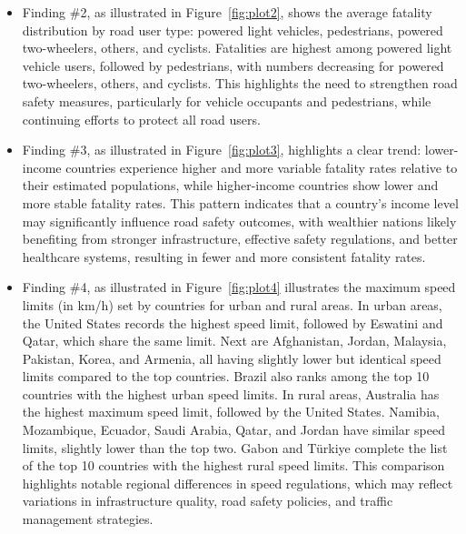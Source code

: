 \documentclass[a4paper,10pt]{article}\setlength{\textheight}{10in}\setlength{\textwidth}{6.5in}\setlength{\topmargin}{-0.125in}\setlength{\oddsidemargin}{-.2in}\setlength{\evensidemargin}{-.2in}\setlength{\headsep}{0.2in}\setlength{\footskip}{0pt}\usepackage{amsmath}\usepackage{fancyhdr}\usepackage{enumitem}\usepackage{hyperref}\usepackage{xcolor}\usepackage{graphicx}\usepackage[export]{adjustbox}\usepackage{caption}\usepackage{float}\usepackage{booktabs}\usepackage{makecell}\pagestyle{fancy}
\begin{document}
\begin{enumerate}[topsep=0mm, partopsep=0mm, leftmargin=*]
\begin{itemize}
        \item Finding \#2, as illustrated in Figure~\ref{fig:plot2}, shows the average fatality distribution by road user type: powered light vehicles, pedestrians, powered two-wheelers, others, and cyclists. Fatalities are highest among powered light vehicle users, followed by pedestrians, with numbers decreasing for powered two-wheelers, others, and cyclists. This highlights the need to strengthen road safety measures, particularly for vehicle occupants and pedestrians, while continuing efforts to protect all road users.

        \item Finding \#3, as illustrated in Figure~\ref{fig:plot3}, highlights a clear trend: lower-income countries experience higher and more variable fatality rates relative to their estimated populations, while higher-income countries show lower and more stable fatality rates. This pattern indicates that a country’s income level may significantly influence road safety outcomes, with wealthier nations likely benefiting from stronger infrastructure, effective safety regulations, and better healthcare systems, resulting in fewer and more consistent fatality rates.
        
        \item Finding \#4, as illustrated in Figure~\ref{fig:plot4} illustrates the maximum speed limits (in km/h) set by countries for urban and rural areas. In urban areas, the United States records the highest speed limit, followed by Eswatini and Qatar, which share the same limit. Next are Afghanistan, Jordan, Malaysia, Pakistan, Korea, and Armenia, all having slightly lower but identical speed limits compared to the top countries. Brazil also ranks among the top 10 countries with the highest urban speed limits.
In rural areas, Australia has the highest maximum speed limit, followed by the United States. Namibia, Mozambique, Ecuador, Saudi Arabia, Qatar, and Jordan have similar speed limits, slightly lower than the top two. Gabon and Türkiye complete the list of the top 10 countries with the highest rural speed limits.
This comparison highlights notable regional differences in speed regulations, which may reflect variations in infrastructure quality, road safety policies, and traffic management strategies.

    \end{itemize}







\end{enumerate}
\end{document}
